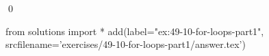 
\begin{ex}
  \label{ex:49-10-for-loops-part1}
  
  \qed
\end{ex}
\begin{python0}
from solutions import *
add(label="ex:49-10-for-loops-part1",
    srcfilename='exercises/49-10-for-loops-part1/answer.tex')
\end{python0}
